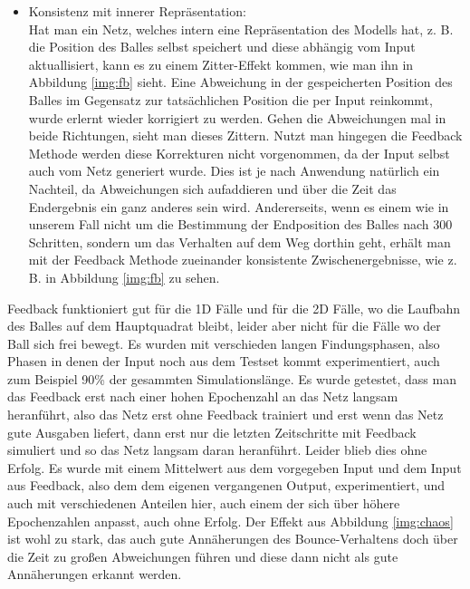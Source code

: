 \begin{description}
\begin{itemize}
		\item Konsistenz mit innerer Repräsentation: \hfill \\
		 Hat man ein Netz, welches intern eine Repräsentation des Modells hat, z. B. die Position des Balles selbst speichert und diese abhängig vom Input aktuallisiert, kann es zu einem Zitter-Effekt kommen, wie man ihn in Abbildung \ref{img:fb} sieht. Eine Abweichung in der gespeicherten Position des Balles im Gegensatz zur tatsächlichen Position die per Input reinkommt, wurde erlernt wieder korrigiert zu werden. Gehen die Abweichungen mal in beide Richtungen, sieht man dieses Zittern. Nutzt man hingegen die Feedback Methode werden diese Korrekturen nicht vorgenommen, da der Input selbst auch vom Netz generiert wurde. Dies ist je nach Anwendung natürlich ein Nachteil, da Abweichungen sich aufaddieren und über die Zeit das Endergebnis ein ganz anderes sein wird. Andererseits, wenn es einem wie in unserem Fall nicht um die Bestimmung der Endposition des Balles nach 300 Schritten, sondern um das Verhalten auf dem Weg dorthin geht, erhält man mit der Feedback Methode zueinander konsistente Zwischenergebnisse, wie z. B. in Abbildung \ref{img:fb} zu sehen.
	\end{itemize}
	Feedback funktioniert gut für die 1D Fälle und für die 2D Fälle, wo die Laufbahn des Balles auf dem Hauptquadrat bleibt, leider aber nicht für die Fälle wo der Ball sich frei bewegt. Es wurden mit verschieden langen Findungsphasen, also Phasen in denen der Input noch aus dem Testset kommt experimentiert, auch zum Beispiel 90\% der gesammten Simulationslänge. Es wurde getestet, dass man das Feedback erst nach einer hohen Epochenzahl an das Netz langsam heranführt, also das Netz erst ohne Feedback trainiert und erst wenn das Netz gute Ausgaben liefert, dann erst nur die letzten Zeitschritte mit Feedback simuliert und so das Netz langsam daran heranführt. Leider blieb dies ohne Erfolg. Es wurde mit einem Mittelwert aus dem vorgegeben Input und dem Input aus Feedback, also dem dem eigenen vergangenen Output, experimentiert, und auch mit verschiedenen Anteilen hier, auch einem der sich über höhere Epochenzahlen anpasst, auch ohne Erfolg. Der Effekt aus Abbildung \ref{img:chaos} ist wohl zu stark, das auch gute Annäherungen des Bounce-Verhaltens doch über die Zeit zu großen Abweichungen führen und diese dann nicht als gute Annäherungen erkannt werden. 
	

\end{description}
